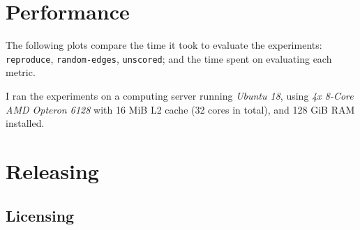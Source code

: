 \section{Performance}

The following plots compare the time it took to evaluate the experiments: \texttt{reproduce}, \texttt{random-edges}, \texttt{unscored}; and the time spent on evaluating each metric.

I ran the experiments on a computing server running \textsl{Ubuntu 18}, using \textsl{4x 8-Core AMD Opteron 6128} with 16 MiB L2 cache (32 cores in total), and 128 GiB RAM installed.





\section{Releasing \graffs}

\subsection{Licensing}
